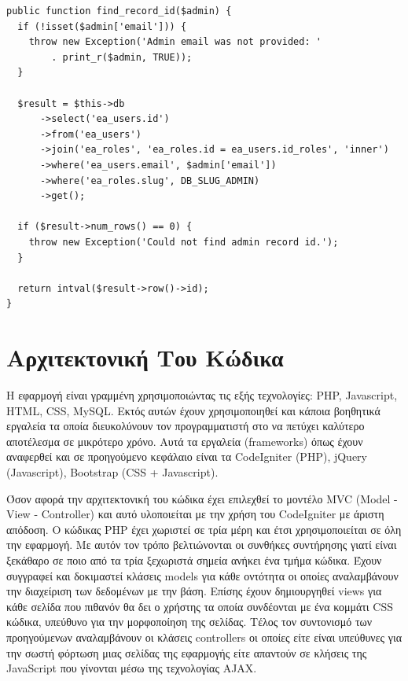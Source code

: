 \begin{verbatim}
public function find_record_id($admin) {
  if (!isset($admin['email'])) {
    throw new Exception('Admin email was not provided: ' 
	    . print_r($admin, TRUE));
  }
	
  $result = $this->db
      ->select('ea_users.id')
      ->from('ea_users')
      ->join('ea_roles', 'ea_roles.id = ea_users.id_roles', 'inner')
      ->where('ea_users.email', $admin['email'])
      ->where('ea_roles.slug', DB_SLUG_ADMIN)
      ->get();
	
  if ($result->num_rows() == 0) {
    throw new Exception('Could not find admin record id.');
  }
	
  return intval($result->row()->id);
}
\end{verbatim}

\section{Αρχιτεκτονική Του Κώδικα}
Η εφαρμογή είναι γραμμένη χρησιμοποιώντας τις εξής τεχνολογίες: PHP, Javascript, HTML, CSS, MySQL. Εκτός αυτών έχουν χρησιμοποιηθεί και κάποια βοηθητικά εργαλεία τα οποία διευκολύνουν τον προγραμματιστή στο να πετύχει καλύτερο αποτέλεσμα σε μικρότερο χρόνο. Αυτά τα εργαλεία (frameworks) όπως έχουν αναφερθεί και σε προηγούμενο κεφάλαιο είναι τα CodeIgniter (PHP), jQuery (Javascript), Bootstrap (CSS + Javascript). 

Όσον αφορά την αρχιτεκτονική του κώδικα έχει επιλεχθεί το μοντέλο MVC (Model - View - Controller) και αυτό υλοποιείται με την χρήση του CodeIgniter με άριστη απόδοση. Ο κώδικας PHP έχει χωριστεί σε τρία μέρη και έτσι χρησιμοποιείται σε όλη την εφαρμογή. Με αυτόν τον τρόπο βελτιώνονται οι συνθήκες συντήρησης γιατί είναι ξεκάθαρο σε ποιο από τα τρία ξεχωριστά σημεία ανήκει ένα τμήμα κώδικα. Έχουν συγγραφεί και δοκιμαστεί κλάσεις models για κάθε οντότητα οι οποίες αναλαμβάνουν την διαχείριση των δεδομένων με την βάση. Επίσης έχουν δημιουργηθεί views για κάθε σελίδα που πιθανόν θα δει ο χρήστης τα οποία συνδέονται με ένα κομμάτι CSS κώδικα, υπεύθυνο για την μορφοποίηση της σελίδας. Τέλος τον συντονισμό των προηγούμενων αναλαμβάνουν οι κλάσεις controllers οι οποίες είτε είναι υπεύθυνες για την  σωστή φόρτωση μιας σελίδας της εφαρμογής είτε απαντούν σε κλήσεις της JavaScript που γίνονται μέσω της τεχνολογίας AJAX.

